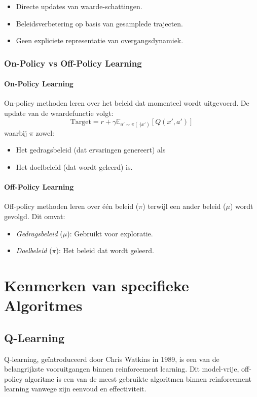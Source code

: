 \documentclass[a4paper,12pt]{report}
\begin{document}
\begin{itemize}
    \item Directe updates van waarde-schattingen.
    \item Beleidsverbetering op basis van gesamplede trajecten.
    \item Geen expliciete representatie van overgangsdynamiek.
\end{itemize}

\subsection{On-Policy vs Off-Policy Learning}
\subsubsection{On-Policy Learning}
On-policy methoden leren over het beleid dat momenteel wordt uitgevoerd. De
update van de waardefunctie volgt:
\[
    \text{Target} = r + \gamma \mathbb{E}_{a' \sim \pi(\cdot|x')}[Q(x',a')]
\]
waarbij \(\pi\) zowel:

\begin{itemize}
    \item Het gedragsbeleid (dat ervaringen genereert) als
    \item Het doelbeleid (dat wordt geleerd) is.
\end{itemize}

\subsubsection{Off-Policy Learning}
Off-policy methoden leren over één beleid (\(\pi\)) terwijl een ander beleid
(\(\mu\)) wordt gevolgd. Dit omvat:

\begin{itemize}
    \item \textit{Gedragsbeleid} (\(\mu\)): Gebruikt voor exploratie.
    \item \textit{Doelbeleid} (\(\pi\)): Het beleid dat wordt geleerd.
\end{itemize}

\chapter{Kenmerken van specifieke Algoritmes}

\section{Q-Learning}
Q-learning, geïntroduceerd door Chris Watkins in 1989, is een van de
belangrijkste vooruitgangen binnen reinforcement learning. Dit model-vrije,
off-policy algoritme is een van de meest gebruikte algoritmen binnen
reinforcement learning vanwege zijn eenvoud en effectiviteit.
\end{document}

